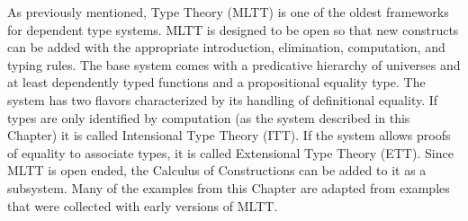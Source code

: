 As previously mentioned, \MartinL{} Type Theory (\ac{MLTT})\cite{Martin-Lof-1972} is one of the oldest frameworks for dependent type systems.
\ac{MLTT} is designed to be open so that new constructs can be added with the appropriate introduction, elimination, computation, and typing rules.
The base system comes with a predicative hierarchy of universes and at least dependently typed functions and a propositional equality type.
The system has two flavors characterized by its handling of definitional equality.
If types are only identified by computation (as the system described in this Chapter) it is called Intensional Type Theory (\ac{ITT}).
If the system allows proofs of equality to associate types, it is called Extensional Type Theory (\ac{ETT}).
Since \ac{MLTT} is open ended, the Calculus of Constructions can be added to it as a subsystem\cite{aspinall2004dependent,hofmann1997extensional}.
Many of the examples from this Chapter are adapted from examples that were collected with early versions of \ac{MLTT}\cite{Martin-Lof-1971}.
 

 
